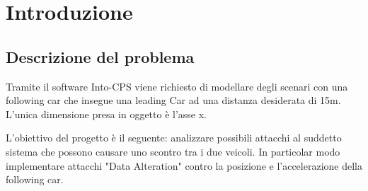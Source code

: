 \section{Introduzione}
\subsection{Descrizione del problema}
Tramite il software Into-CPS viene richiesto di modellare degli scenari con una following car che insegue una leading Car ad una distanza desiderata di 15m. L'unica dimensione presa in oggetto è l'asse x.

L'obiettivo del progetto è il seguente: analizzare possibili attacchi al suddetto sistema che possono causare uno scontro tra i due veicoli. In particolar modo implementare attacchi "Data Alteration" contro la posizione e l'accelerazione della following car.


